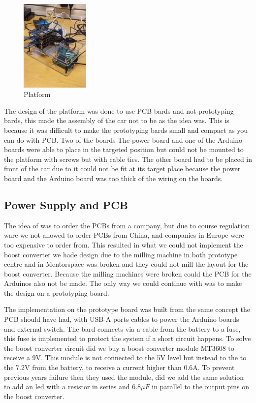 \documentclass[11pt, titlepage]{article} %
\begin{document}
\begin{figure}
	\includegraphics[width=0.3\textwidth]{platform_assembely.jpg}
	\caption{Platform}
	\label{fig:platform_ass}
\end{figure}

The design of the platform was done to use PCB bards and not prototyping bards, this made the assembly of the car not to be as the idea was. This is because it was difficult to make the prototyping bards small and compact as you can do with PCB.  Two of the boards The power board and one of the Arduino boards were able to place in the targeted position but could not be mounted to the platform with screws but with cable ties. The other board had to be placed in front of the car due to it could not be fit at its target place because the power board and the Arduino board was too thick of the wiring on the boards. 
 

\subsection{Power Supply and PCB}

The idea of was to order the PCBs from a company, but due to course regulation ware we not allowed to order PCBs from China, and companies in Europe were too expensive to order from. This resulted in what we could not implement the boost converter we hade design due to the milling machine in both prototype centre and in Mentorspace was broken and they could not mill the layout for the boost converter. Because the milling machines were broken could the PCB for the Arduinos also not be made. The only way we could continue with was to make the design on a prototyping board. 

The implementation on the prototype board was built from the same concept the PCB should have had, with USB-A ports cables to power the Arduino boards and external switch. The bard connects via a cable from the battery to a fuse, this fuse is implemented to protect the system if a short circuit happens. To solve the boost converter circuit did we buy a boost converter module MT3608 to receive a 9V. This module is not connected to the 5V level but instead to the to the 7.2V from the battery, to receive a current higher than 0.6A. To prevent previous years failure then they used the module, did we add the same solution to add an led with a resistor in series and $ 6.8\mu F$ in parallel to the output pins on the boost converter.
\end{document}
